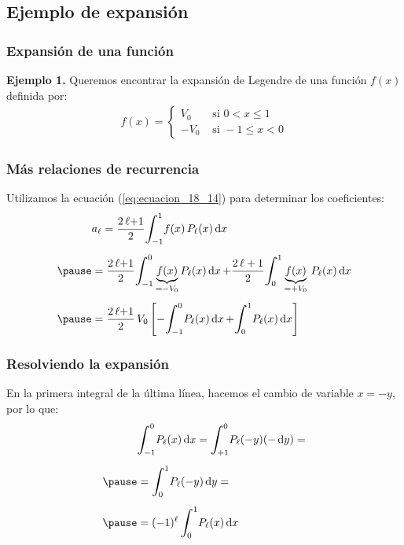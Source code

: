 \documentclass[12pt]{beamer}
\begin{document}
\subsection{Ejemplo de expansión}

\begin{frame}
\frametitle{Expansión de una función}
\textbf{Ejemplo 1.} Queremos encontrar la expansión de Legendre de una función $f (x)$ definida por:
\begin{align*}
f (x) = \begin{cases}
V_{0} & \mbox{ si } 0 < x \leq 1 \\[0.5em]
- V_{0} & \mbox{ si } -1 \leq x < 0
\end{cases}
\end{align*}
\end{frame}
\begin{frame}
\frametitle{Más relaciones de recurrencia}
Utilizamos la ecuación (\ref{eq:ecuacion_18_14}) para determinar los coeficientes:
\pause
\begin{eqnarray*}
\begin{aligned}
&a_{\ell} = \dfrac{2 \, \ell {+} 1}{2} \scaleint{6ex}_{\bs -1}^{1} f (x) \, P_{\ell} (x) \dd{x} \\[0.5em] \pause
&= \dfrac{2 \, \ell {+} 1}{2} \scaleint{6ex}_{\bs -1}^{0} \underbrace{f(x)}_{=-V_0}  P_{\ell} (x) \dd{x} {+} \dfrac{2 \, \ell + 1}{2} \scaleint{6ex}_{\bs 0}^{1} \underbrace{f (x)}_{=+V_0} \, P_{\ell} (x) \dd{x} \\[0.5em] \pause
&= \dfrac{2 \, \ell {+} 1}{2} \, V_{0} \left[ - \scaleint{6ex}_{\bs -1}^{0} P_{\ell} (x) \dd{x} {+} \scaleint{6ex}_{\bs 0}^{1} P_{\ell} (x) \dd{x} \right]
\end{aligned}
\end{eqnarray*}
\end{frame}
\begin{frame}
\frametitle{Resolviendo la expansión}
En la primera integral de la última línea, hacemos el cambio de variable $x = -y$, por lo que:
\pause
\begin{eqnarray*}
\begin{aligned}
&\scaleint{6ex}_{\bs -1}^{0} P_{\ell} (x) \dd{x} = \scaleint{6ex}_{\bs +1}^{0} P_{\ell} (-y) (-\dd{y}) = \\[0.5em] \pause
&= \scaleint{6ex}_{\bs 0}^{1} P_{\ell} (-y) \dd{y} = \\[0.5em] \pause
&= (-1)^{\ell} \, \scaleint{6ex}_{\bs 0}^{1} P_{\ell} (x) \dd{x}
\end{aligned}
\end{eqnarray*}
\end{frame}
\end{document}
